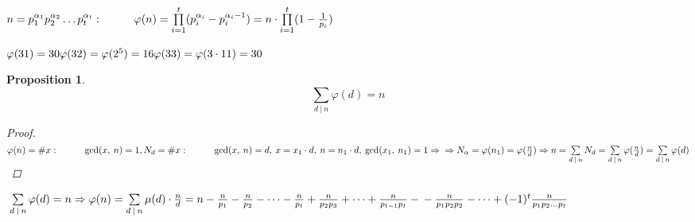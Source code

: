 \documentclass[a4paper,12pt, centered]{bookest}
\newtheorem*{prop*}{Proposition}
\newcommand\tab[1][1cm]{\hspace*{#1}}
\begin{document}
$n=p^{\alpha_1}_1p^{\alpha_2}_2\dots p^{\alpha_t}_t:\tab \varphi(n)=\prod\limits_{i=1}^{t}(p^{\alpha_i}_i-p^{\alpha_i-1}_i)=n\cdot\prod\limits_{i=1}^{t}(1-\frac{1}{p_i})$
\begin{example}
$\varphi(31)=30\\\varphi(32)=\varphi(2^5)=16\\\varphi(33)=\varphi(3\cdot 11)=30$	
\end{example}
\begin{prop*}
$$\sum\limits_{d\>|\>n}\varphi(d)=n$$
\begin{proof}
	$\\\varphi(n)=\# x:\tab\gcd(x,\>n)=1,\\ N_d=\# x:\tab\gcd(x,\>n)=d,\>x=x_1\cdot d,\>n=n_1\cdot d,\>\gcd(x_1,\>n_1)=1\Rightarrow\\\Rightarrow N_\alpha=\varphi(n_1)=\varphi(\frac nd)\Rightarrow n=\sum\limits_{d\>|\>n}N_d=\sum\limits_{d\>|\>n}\varphi(\frac nd)=\sum\limits_{d\>|\>n}\varphi(d)$
\end{proof}	
\end{prop*}
$\\\sum\limits_{d\>|\>n}\varphi(d)=n\Rightarrow\varphi(n)=\sum\limits_{d\>|\>n}\mu(d)\cdot\frac nd=n-\frac n{p_1}-\frac n{p_2}-\dots-\frac n{p_t}+\frac n{p_2p_3}+\dots+\frac n{p_{t-1}p_t}-\\-\frac n{p_1p_2p_2}-\dots+(-1)^t\frac n{p_1p_2\dots p_t}$
\end{document}
